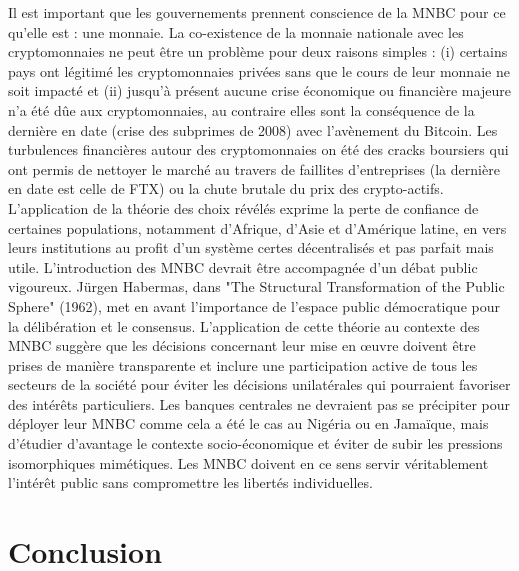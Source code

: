 \documentclass[12pt]{article}
\begin{document}
Il est important que les gouvernements prennent conscience de la MNBC pour ce qu'elle est : une monnaie. La co-existence de la monnaie nationale avec les cryptomonnaies ne peut être un problème pour deux raisons simples : (i) certains pays ont légitimé les cryptomonnaies privées sans que le cours de leur monnaie ne soit impacté et (ii) jusqu'à présent aucune crise économique ou financière majeure n'a été dûe aux cryptomonnaies, au contraire elles sont la conséquence de la dernière en date (crise des subprimes de 2008) avec l'avènement du Bitcoin. Les turbulences financières autour des cryptomonnaies on été des cracks boursiers qui ont permis de nettoyer le marché au travers de faillites d'entreprises (la dernière en date est celle de FTX) ou la chute brutale du prix des crypto-actifs. L'application de la théorie des choix révélés exprime la perte de confiance de certaines populations, notamment d'Afrique, d'Asie et d'Amérique latine, en vers leurs institutions au profit d'un système certes décentralisés et pas parfait mais utile. L'introduction des MNBC devrait être accompagnée d'un débat public vigoureux. Jürgen Habermas, dans "The Structural Transformation of the Public Sphere" (1962), met en avant l'importance de l'espace public démocratique pour la délibération et le consensus. L'application de cette théorie au contexte des MNBC suggère que les décisions concernant leur mise en œuvre doivent être prises de manière transparente et inclure une participation active de tous les secteurs de la société pour éviter les décisions unilatérales qui pourraient favoriser des intérêts particuliers. Les banques centrales ne devraient pas se précipiter pour déployer leur MNBC comme cela a été le cas au Nigéria ou en Jamaïque, mais d'étudier d'avantage le contexte socio-économique et éviter de subir les pressions isomorphiques mimétiques. Les MNBC doivent en ce sens servir véritablement l'intérêt public sans compromettre les libertés individuelles.

\clearpage

\section{Conclusion}
\end{document}
